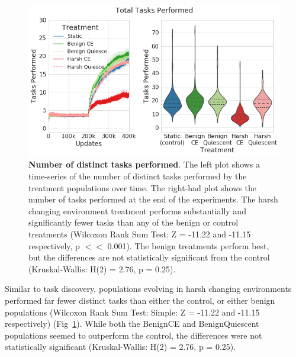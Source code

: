 \documentclass[10pt,letterpaper]{article}
\begin{document}
	\begin{figure}[!h]
	\includegraphics[width=0.95\columnwidth]{figures/LTE/lte-simple-task_performance.png}
	\caption{\textbf{Number of distinct tasks performed}. The left plot shows a time-series of the number of distinct tasks performed by the treatment populations over time. The right-had plot shows the number of tasks performed at the end of the experiments. The harsh changing environment treatment performs substantially and significantly fewer tasks than any of the benign or control treatments (Wilcoxon Rank Sum Test: Z = -11.22 and -11.15 respectively, p $<<$ 0.001). The benign treatments perform best, but the differences are not statistically significant from the control (Kruskal-Wallis: H(2) = 2.76, p = 0.25). %
	}
	\label{fig:lte-simple-task_performance}
	\end{figure}  


Similar to task discovery, populations evolving in harsh changing environments performed far fewer distinct tasks than either the control, or either benign populations (Wilcoxon Rank Sum Test: Simple: Z = -11.22 and -11.15 respectively) (Fig~\ref{fig:lte-simple-task_performance}). While both the BenignCE and BenignQuiescent
populations seemed to outperform the control, 
the differences were not statistically significant (Kruskal-Wallis: H(2) = 2.76, p = 0.25).
\end{document}
